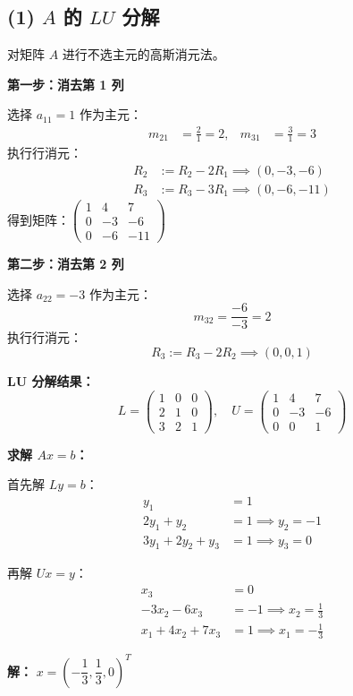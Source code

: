 \documentclass{article}
\begin{document}
\subsection*{(1) $A$ 的 $LU$ 分解}
\begin{solution}

  对矩阵 $A$ 进行不选主元的高斯消元法。

  \textbf{第一步：消去第 1 列}

  选择 $a_{11} = 1$ 作为主元：
  \begin{align*}
    m_{21} &= \frac{2}{1} = 2, & m_{31} &= \frac{3}{1} = 3
  \end{align*}
  执行行消元：
  \begin{align*}
    R_2 &:= R_2 - 2R_1 \implies (0, -3, -6) \\
    R_3 &:= R_3 - 3R_1 \implies (0, -6, -11)
  \end{align*}
  得到矩阵：$
  \begin{pmatrix}1&4&7\\0&-3&-6\\0&-6&-11
  \end{pmatrix}$

  \textbf{第二步：消去第 2 列}

  选择 $a_{22} = -3$ 作为主元：
  \[
    m_{32} = \frac{-6}{-3} = 2
  \]
  执行行消元：
  \[
    R_3 := R_3 - 2R_2 \implies (0, 0, 1)
  \]

  \textbf{LU 分解结果：}
  \[
    \boxed{
      L =
      \begin{pmatrix}1&0&0\\2&1&0\\3&2&1
      \end{pmatrix}, \quad
      U =
      \begin{pmatrix}1&4&7\\0&-3&-6\\0&0&1
      \end{pmatrix}
    }
  \]

  \textbf{求解 $Ax = b$：}

  首先解 $Ly = b$：
  \begin{align*}
    y_1 &= 1 \\
    2y_1 + y_2 &= 1 \implies y_2 = -1 \\
    3y_1 + 2y_2 + y_3 &= 1 \implies y_3 = 0
  \end{align*}

  再解 $Ux = y$：
  \begin{align*}
    x_3 &= 0 \\
    -3x_2 - 6x_3 &= -1 \implies x_2 = \frac{1}{3} \\
    x_1 + 4x_2 + 7x_3 &= 1 \implies x_1 = -\frac{1}{3}
  \end{align*}

  \textbf{解：} $\boxed{x = \left(-\dfrac{1}{3}, \dfrac{1}{3}, 0\right)^T}$
\end{solution}
\end{document}

